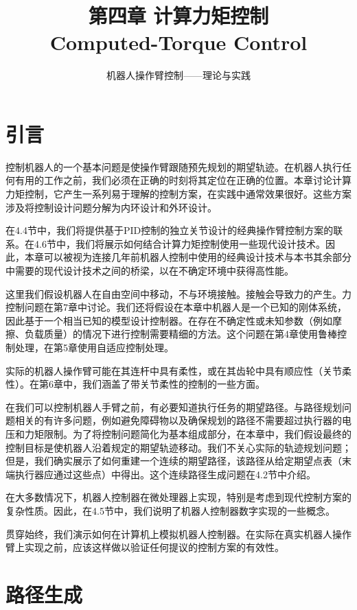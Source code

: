 \documentclass[UTF8]{ctexart}
\title{\textbf{第四章 计算力矩控制}\\
\large Computed-Torque Control}
\author{机器人操作臂控制——理论与实践}
\date{}
\theoremstyle{definition}
\begin{document}
\maketitle

\section{引言}

控制机器人的一个基本问题是使操作臂跟随预先规划的期望轨迹。在机器人执行任何有用的工作之前，我们必须在正确的时刻将其定位在正确的位置。本章讨论计算力矩控制，它产生一系列易于理解的控制方案，在实践中通常效果很好。这些方案涉及将控制设计问题分解为内环设计和外环设计。

在4.4节中，我们将提供基于PID控制的独立关节设计的经典操作臂控制方案的联系。在4.6节中，我们将展示如何结合计算力矩控制使用一些现代设计技术。因此，本章可以被视为连接几年前机器人控制中使用的经典设计技术与本书其余部分中需要的现代设计技术之间的桥梁，以在不确定环境中获得高性能。

这里我们假设机器人在自由空间中移动，不与环境接触。接触会导致力的产生。力控制问题在第7章中讨论。我们还将假设在本章中机器人是一个已知的刚体系统，因此基于一个相当已知的模型设计控制器。在存在不确定性或未知参数（例如摩擦、负载质量）的情况下进行控制需要精细的方法。这个问题在第4章使用鲁棒控制处理，在第5章使用自适应控制处理。

实际的机器人操作臂可能在其连杆中具有柔性，或在其齿轮中具有顺应性（关节柔性）。在第6章中，我们涵盖了带关节柔性的控制的一些方面。

在我们可以控制机器人手臂之前，有必要知道执行任务的期望路径。与路径规划问题相关的有许多问题，例如避免障碍物以及确保规划的路径不需要超过执行器的电压和力矩限制。为了将控制问题简化为基本组成部分，在本章中，我们假设最终的控制目标是使机器人沿着规定的期望轨迹移动。我们不关心实际的轨迹规划问题；但是，我们确实展示了如何重建一个连续的期望路径，该路径从给定期望点表（末端执行器应通过这些点）中得出。这个连续路径生成问题在4.2节中介绍。

在大多数情况下，机器人控制器在微处理器上实现，特别是考虑到现代控制方案的复杂性质。因此，在4.5节中，我们说明了机器人控制器数字实现的一些概念。

贯穿始终，我们演示如何在计算机上模拟机器人控制器。在实际在真实机器人操作臂上实现之前，应该这样做以验证任何提议的控制方案的有效性。

\section{路径生成}
\end{document}
